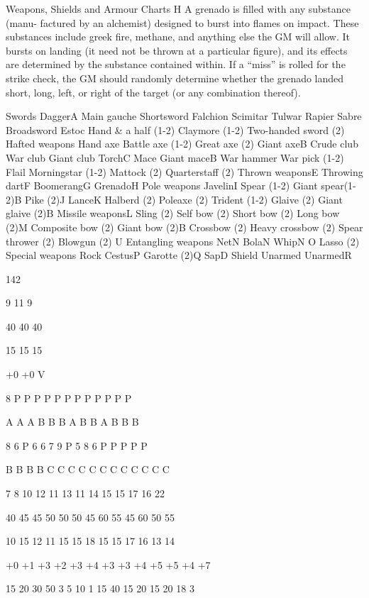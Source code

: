 \begin{Table}{Weapons, Shields and Armour Charts}
H  A  grenado  is  filled  with  any  substance  (manu-
factured  by  an  alchemist)  designed  to  burst  into 
flames  on  impact.  These  substances  include  greek 
fire, methane, and anything else the GM will allow. 
It  bursts  on  landing  (it  need  not  be  thrown  at  a 
particular figure), and its effects are determined by 
the substance contained within. If a “miss” is rolled 
for  the  strike  check,  the  GM  should  randomly 
determine  whether  the  grenado  landed  short,  long, 
left,  or  right  of  the  target  (or  any  combination 
thereof). 

Swords 
DaggerA 
Main gauche 
Shortsword 
Falchion 
Scimitar 
Tulwar 
Rapier 
Sabre 
Broadsword 
Estoc 
Hand \& a half (1-2) 
Claymore (1-2) 
Two-handed sword (2) 
Hafted weapons 
Hand axe 
Battle axe (1-2) 
Great axe (2) 
Giant axeB 
Crude club 
War club 
Giant club 
TorchC 
Mace 
Giant maceB 
War hammer 
War pick (1-2) 
Flail 
Morningstar (1-2) 
Mattock (2) 
Quarterstaff (2) 
Thrown weaponsE 
Throwing dartF 
BoomerangG 
GrenadoH 
Pole weapons 
JavelinI 
Spear (1-2) 
Giant spear(1-2)B 
Pike (2)J 
LanceK 
Halberd (2) 
Poleaxe (2) 
Trident (1-2) 
Glaive (2) 
Giant glaive (2)B 
Missile weaponsL 
Sling (2) 
Self bow (2) 
Short bow (2) 
Long bow (2)M 
Composite bow (2) 
Giant bow (2)B 
Crossbow (2) 
Heavy crossbow (2) 
Spear thrower (2) 
Blowgun (2) U 
Entangling weapons 
NetN 
BolaN 
WhipN O 
Lasso (2) 
Special weapons 
Rock 
CestusP 
Garotte (2)Q 
SapD 
Shield 
Unarmed 
UnarmedR 
 

142 

9 
11 
9 

40 
40 
40 

15 
15 
15 

+0 
+0 
V 

8 
P 
P 
P 
P 
P 
P 
P 
P 
P 
P 
P 
P 

A 
A 
A 
B 
B 
B 
A 
B 
B 
A 
B 
B 
B 

8 
6 
P 
6 
6 
7 
9 
P 
5 
8 
6 
P 
P 
P 
P 
P 

B 
B 
B 
B 
C 
C 
C 
C 
C 
C 
C 
C 
C 
C 
C 
C 

7 
8 
10 
12 
11 
13 
11 
14 
15 
15 
17 
16 
22 

40 
45 
45 
50 
50 
50 
45 
60 
55 
45 
60 
50 
55 

 
10 
15 
12 
11 
15 
15 
18 
15 
15 
17 
16 
13 
14 

+0 
+1 
+3 
+2 
+3 
+4 
+3 
+3 
+4 
+5 
+5 
+4 
+7 

15 
20 
30 
50 
3 
5 
10 
1 
15 
40 
15 
20 
15 
20 
18 
3 


\end{Table}
